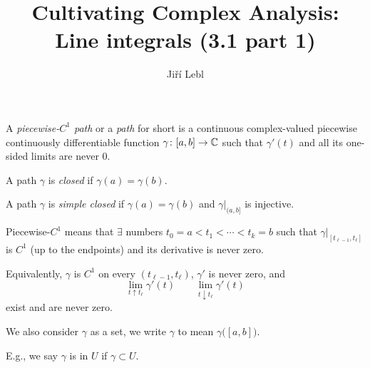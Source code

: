 \documentclass[10pt,aspectratio=169]{beamer}
\author{Ji\v{r}\'i Lebl}
\institute[OSU]{%
Departemento pri Matematiko de Oklahoma {\^S}tata Universitato}
\title{Cultivating Complex Analysis:\\%
Line integrals (3.1 part 1)}
\date{}
\begin{document}
\begin{frame}
\titlepage
\end{frame}

\begin{frame}
A \emph{piecewise-$C^1$ path} or a \emph{path} for short
is
a continuous complex-valued piecewise continuously
differentiable function $\gamma \colon [a,b] \to {\mathbb{C}}$ 
such that $\gamma'(t)$ and all its one-sided limits are never
0.

\medskip
\pause

A path $\gamma$ is \emph{closed} if $\gamma(a)=\gamma(b)$.

\medskip
\pause

A path $\gamma$ is \emph{simple closed}
if $\gamma(a)=\gamma(b)$ and $\gamma|_{(a,b]}$ is injective.

\medskip
\pause

Piecewise-$C^1$ means that $\exists$ numbers $t_0 = a < t_1 < \cdots < t_k = b$
such that $\gamma|_{[t_{\ell-1},t_\ell]}$ is $C^1$ (up to the endpoints)
and its derivative is never zero.

\medskip
\pause

Equivalently, $\gamma$ is $C^1$ on every $(t_{\ell-1},t_\ell)$, $\gamma'$ is
never zero, and
\[
\lim_{t \uparrow t_\ell} \gamma'(t) \qquad
\lim_{t \downarrow t_\ell} \gamma'(t)
\]
exist and are never zero.

\medskip
\pause

We also consider $\gamma$ as a set, we write $\gamma$ to mean $\gamma\bigl([a,b]\bigr)$.

\medskip
\pause

E.g.,
we say $\gamma$ is in $U$ if $\gamma \subset U$.
\end{frame}
\end{document}
